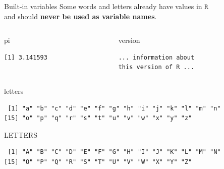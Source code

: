 \documentclass[
  ignorenonframetext,
]{beamer}
\newenvironment{Shaded}{\begin{snugshade}}{\end{snugshade}}
\newcommand{\NormalTok}[1]{#1}
\begin{document}
\begin{frame}[fragile]{Built-in variables}
\protect\hypertarget{built-in-variables}{}
Some words and letters already have values in \(\texttt{R}\)\\
and should \textbf{never be used as variable names}.

\begin{columns}[T,onlytextwidth]
\begin{column}{0.45\textwidth}
\begin{Shaded}
\begin{Highlighting}[]
\NormalTok{pi}
\end{Highlighting}
\end{Shaded}

\begin{verbatim}
[1] 3.141593
\end{verbatim}
\end{column}

\begin{column}{0.45\textwidth}
\begin{Shaded}
\begin{Highlighting}[]
\NormalTok{version}
\end{Highlighting}
\end{Shaded}

\begin{verbatim}
... information about 
this version of R ...
\end{verbatim}
\end{column}
\end{columns}

\begin{Shaded}
\begin{Highlighting}[]
\NormalTok{letters}
\end{Highlighting}
\end{Shaded}

\begin{verbatim}
 [1] "a" "b" "c" "d" "e" "f" "g" "h" "i" "j" "k" "l" "m" "n"
[15] "o" "p" "q" "r" "s" "t" "u" "v" "w" "x" "y" "z"
\end{verbatim}

\begin{Shaded}
\begin{Highlighting}[]
\NormalTok{LETTERS}
\end{Highlighting}
\end{Shaded}

\begin{verbatim}
 [1] "A" "B" "C" "D" "E" "F" "G" "H" "I" "J" "K" "L" "M" "N"
[15] "O" "P" "Q" "R" "S" "T" "U" "V" "W" "X" "Y" "Z"
\end{verbatim}
\end{frame}
\end{document}
